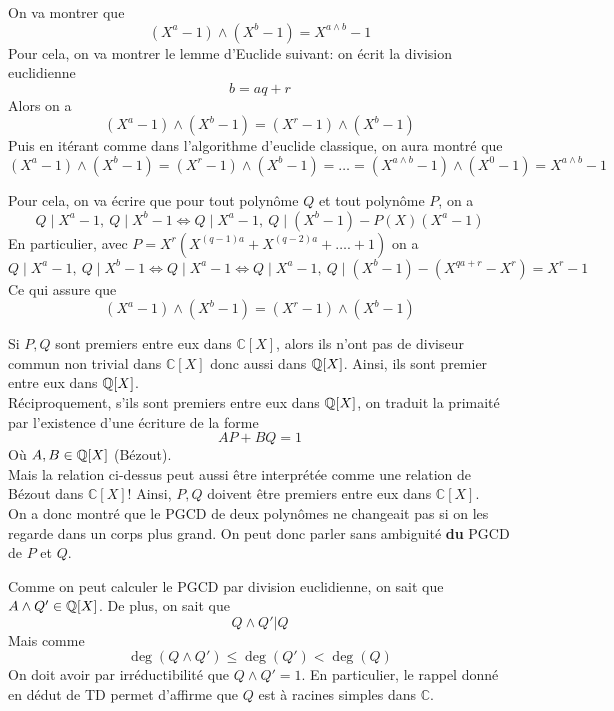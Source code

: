 \begin{sol}
On va montrer que 
$$(X^a-1)\wedge (X^b-1)=X^{a\wedge b}-1 $$
Pour cela, on va montrer le lemme d'Euclide suivant: on écrit la division euclidienne 
$$b=aq+r $$ Alors on a 
$$(X^a-1)\wedge (X^b-1)=(X^r-1)\wedge (X^b-1) $$
Puis en itérant comme dans l'algorithme d'euclide classique, on aura montré que 
$$(X^a-1)\wedge (X^b-1)=(X^r-1)\wedge (X^b-1)=\dots=(X^{a\wedge b}-1)\wedge (X^0-1)=X^{a\wedge b}-1 $$


Pour cela, on va écrire que pour tout polynôme $Q$ et tout polynôme $P$, on a
$$Q\mid X^a-1, \: Q\mid X^b-1\iff Q\mid X^a-1, \: Q\mid (X^b-1)-P(X)(X^a-1) $$
En particulier, avec $P=X^r(X^{(q-1)a}+X^{(q-2)a}+\dots.+1)$ on a 
$$Q\mid X^a-1, \: Q\mid X^b-1\iff Q\mid X^a-1 \iff Q\mid X^a-1, \: Q\mid (X^b-1)-(X^{qa+r}-X^r)=X^r-1$$
Ce qui assure que 
$$(X^a-1)\wedge (X^b-1)=(X^r-1)\wedge (X^b-1) $$
\end{sol}
\begin{sol}
Si $P,Q$ sont premiers entre eux dans $\mathbb{C}[X]$, alors ils n'ont pas de diviseur commun non trivial dans $\mathbb{C}[X]$ donc aussi dans $\mathbb Q[X]$. Ainsi, ils sont premier entre eux dans $\mathbb Q[X]$.
\\
Réciproquement, s'ils sont premiers entre eux dans $\mathbb Q[X]$, on traduit la primaité par l'existence d'une écriture de la forme
$$AP+BQ=1 $$ Où $A,B\in \mathbb Q[X]$ (Bézout).
\\
Mais la relation ci-dessus peut aussi être interprétée comme une relation de Bézout dans $\mathbb{C}[X]$! Ainsi, $P,Q$ doivent être premiers entre eux dans $\mathbb{C}[X]$.
\\
On a donc montré que le PGCD de deux polynômes ne changeait pas si on les regarde dans un corps plus grand. On peut donc parler sans ambiguité \textbf{du} PGCD de $P$ et $Q$.
\end{sol}
\begin{sol}
Comme on peut calculer le PGCD par division euclidienne, on sait que $A\wedge Q'\in \mathbb Q[X]$. De plus, on sait que 
$$Q\wedge Q'|Q $$ Mais comme 
$$\deg(Q\wedge Q')\leq \deg(Q')<\deg(Q) $$
On doit avoir par irréductibilité que $Q\wedge Q'=1$. En particulier, le rappel donné en dédut de TD permet d'affirme que $Q$ est à racines simples dans $\mathbb{C}$.
\end{sol}
